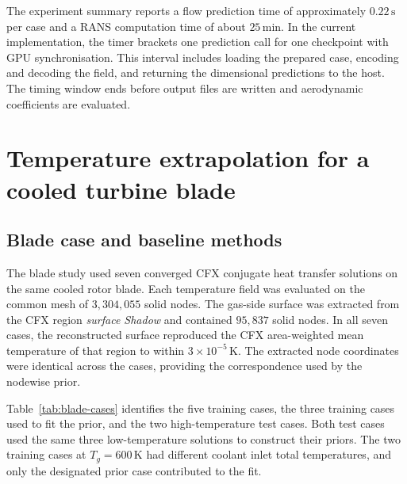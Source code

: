 \documentclass[a4paper,fleqn]{cas-sc}
\begin{document}
The experiment summary reports a flow prediction time of approximately
$0.22\,\mathrm{s}$ per case and a RANS computation time of about $25\,\mathrm{min}$.
In the current implementation, the timer brackets one prediction call for one
checkpoint with GPU synchronisation. This interval includes loading the prepared case,
encoding and decoding the field, and returning the dimensional predictions to the host.
The timing window ends before output files are written and aerodynamic coefficients
are evaluated.

\section{Temperature extrapolation for a cooled turbine blade}\label{sec:blade-results}
\par

\subsection{Blade case and baseline methods}\label{subsec:blade-setup}
\par

The blade study used seven converged CFX conjugate heat transfer solutions on the same
cooled rotor blade. Each temperature field was evaluated on the common mesh of
$3{,}304{,}055$ solid nodes. The gas-side surface was extracted from the CFX region
\emph{surface Shadow} and contained $95{,}837$ solid nodes. In all seven cases, the reconstructed
surface reproduced the CFX area-weighted mean temperature of that region to within
$3\times10^{-5}\,\mathrm{K}$. The extracted node coordinates were identical across
the cases, providing the correspondence used by the nodewise prior.

Table~\ref{tab:blade-cases} identifies the five training cases, the three training cases
used to fit the prior, and the two high-temperature test cases. Both test cases used
the same three low-temperature solutions to construct their priors. The two training
cases at $T_g=600\,\mathrm{K}$ had different coolant inlet total temperatures, and
only the designated prior case contributed to the fit.
\end{document}
